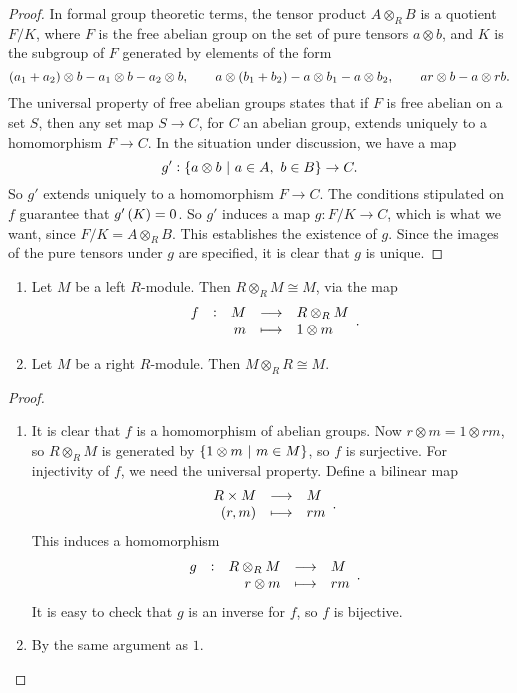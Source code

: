 \begin{proof}
In formal group theoretic terms, the tensor product $ A \otimes_R B $ is a quotient $ F / K $, where $ F $ is the free abelian group on the set of pure tensors $ a \otimes b $, and $ K $ is the subgroup of $ F $ generated by elements of the form
$$ \br{a_1 + a_2} \otimes b - a_1 \otimes b - a_2 \otimes b, \qquad a \otimes \br{b_1 + b_2} - a \otimes b_1 - a \otimes b_2, \qquad ar \otimes b - a \otimes rb. $$
The universal property of free abelian groups states that if $ F $ is free abelian on a set $ S $, then any set map $ S \to C $, for $ C $ an abelian group, extends uniquely to a homomorphism $ F \to C $. In the situation under discussion, we have a map
$$ g' : \cbr{a \otimes b \st a \in A, \ b \in B} \to C. $$
So $ g' $ extends uniquely to a homomorphism $ F \to C $. The conditions stipulated on $ f $ guarantee that $ g'\br{K} = 0 $. So $ g' $ induces a map $ g : F / K \to C $, which is what we want, since $ F / K = A \otimes_R B $. This establishes the existence of $ g $. Since the images of the pure tensors under $ g $ are specified, it is clear that $ g $ is unique.
\end{proof}

\begin{corollary}
\hfill
\begin{enumerate}
\item Let $ M $ be a left $ R $-module. Then $ R \otimes_R M \cong M $, via the map
$$ \function[f]{M}{R \otimes_R M}{m}{1 \otimes m}. $$
\item Let $ M $ be a right $ R $-module. Then $ M \otimes_R R \cong M $.
\end{enumerate}
\end{corollary}

\begin{proof}
\hfill
\begin{enumerate}
\item It is clear that $ f $ is a homomorphism of abelian groups. Now $ r \otimes m = 1 \otimes rm $, so $ R \otimes_R M $ is generated by $ \cbr{1 \otimes m \st m \in M} $, so $ f $ is surjective. For injectivity of $ f $, we need the universal property. Define a bilinear map
$$ \function{R \times M}{M}{\br{r, m}}{rm}. $$
This induces a homomorphism
$$ \function[g]{R \otimes_R M}{M}{r \otimes m}{rm}. $$
It is easy to check that $ g $ is an inverse for $ f $, so $ f $ is bijective.
\item By the same argument as $ 1 $.
\end{enumerate}
\end{proof}

